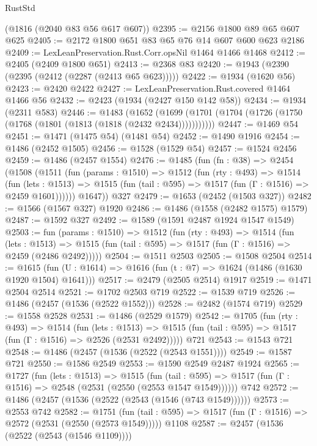 \begin{lexlean}{RustStd}
\begin{coremodule}
    (@1816 (@2040 @83 @56 @617 @607))
@2395 := @2156 @1800 @89 @65 @607 @625
@2405 := @2172 @1800 @651 @83 @65 @76 @14 @607 @600 @623 @2186
@2409 := LexLeanPreservation.Rust.Corr.opsNil @1464 @1466 @1468
@2412 := @2405 (@2409 @1800 @651)
@2413 := @2368 @83
@2420 := @1943 (@2390 (@2395 (@2412 (@2287 (@2413 @65 @623)))))
@2422 := @1934 (@1620 @56)
@2423 := @2420 @2422
@2427 := LexLeanPreservation.Rust.covered @1464 @1466 @56
@2432 := @2423 (@1934 (@2427 @150 @142 @58))
@2434 := @1934 (@2311 @583)
@2446 := @1483
    (@1652 (@1699 (@1701 (@1704 (@1726 (@1750 (@1768 (@1801 (@1813 (@1818 (@2432 @2434)))))))))))
@2447 := @1469 @54
@2451 := @1471 (@1475 @54) (@1481 @54)
@2452 := @1490 @1916
@2454 := @1486 (@2452 @1505)
@2456 := @1528 (@1529 @54)
@2457 := @1524 @2456
@2459 := @1486 (@2457 @1554)
@2476 := @1485
    (fun (fn : @38) =>
    @2454
      (@1508
        (@1511
          (fun (params : @1510) =>
          @1512
            (fun (rty : @493) =>
            @1514
              (fun (lets : @1513) =>
              @1515 (fun (tail : @595) => @1517 (fun (Γ : @1516) => @2459 @1601))))))
        @1647))
    @327
@2479 := @1653 (@2452 (@1503 @327))
@2482 := @1566 (@1567 @327) @1920
@2486 := @1486 (@1558 (@2482 @1575) @1579)
@2487 := @1592 @327
@2492 := @1589 (@1591 @2487 @1924 @1547 @1549)
@2503 := fun (params : @1510) =>
  @1512
    (fun (rty : @493) =>
    @1514
      (fun (lets : @1513) =>
      @1515 (fun (tail : @595) => @1517 (fun (Γ : @1516) => @2459 (@2486 @2492)))))
@2504 := @1511 @2503
@2505 := @1508 @2504
@2514 := @1615 (fun (U : @1614) => @1616 (fun (t : @7) => @1624 (@1486 (@1630 @1920 @1504) @1641)))
@2517 := @2479 (@2505 @2514) @1917
@2519 := @1471 @2504 @2514
@2521 := @1702 @2503 @719
@2522 := @1539 @719
@2526 := @1486 (@2457 (@1536 (@2522 @1552)))
@2528 := @2482 (@1574 @719)
@2529 := @1558 @2528
@2531 := @1486 (@2529 @1579)
@2542 := @1705
    (fun (rty : @493) =>
    @1514
      (fun (lets : @1513) =>
      @1515 (fun (tail : @595) => @1517 (fun (Γ : @1516) => @2526 (@2531 @2492)))))
    @721
@2543 := @1543 @721
@2548 := @1486 (@2457 (@1536 (@2522 (@2543 @1551))))
@2549 := @1587 @721
@2550 := @1586 @2549
@2553 := @1590 @2549 @2487 @1924
@2565 := @1727
    (fun (lets : @1513) =>
    @1515
      (fun (tail : @595) => @1517 (fun (Γ : @1516) => @2548 (@2531 (@2550 (@2553 @1547 @1549))))))
    @742
@2572 := @1486 (@2457 (@1536 (@2522 (@2543 (@1546 (@743 @1549))))))
@2573 := @2553 @742
@2582 := @1751
    (fun (tail : @595) => @1517 (fun (Γ : @1516) => @2572 (@2531 (@2550 (@2573 @1549)))))
    @1108
@2587 := @2457 (@1536 (@2522 (@2543 (@1546 @1109))))

\end{coremodule}
\end{lexlean}

